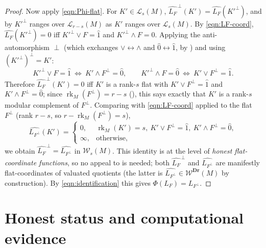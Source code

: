 \documentclass{article}
\theoremstyle{definition}
\newcommand{\rk}{\operatorname{rk}}
\newcommand{\Dr}{\mathbf{Dr}}
\newcommand{\cLL}{\mathcal{L}}
\newcommand{\cW}{\mathcal{W}}
\begin{document}
\begin{proof}
Now apply \eqref{eqn:Phi-flat}. For $K'\in\cLL_{s}(M)$,
$\widehat{L_F}^{\,\perp}(K')=\widehat{L_F}(K'^{\perp})$, and by  $K'^{\perp}$ ranges
over $\cLL_{r-s}(M)$ as $K'$ ranges over $\cLL_{s}(M)$. By \eqref{eqn:LF-coord},
$\widehat{L_F}(K'^{\perp})=0$ iff $K'^{\perp}\vee F=\hat1$ and $K'^{\perp}\wedge F=\hat0$. Applying
the anti-automorphism $\perp$ (which exchanges $\vee\leftrightarrow\wedge$ and
$\hat0\leftrightarrow\hat1$, by ) and using $(K'^{\perp})^{\perp}=K'$:
\[
  K'^{\perp}\vee F=\hat1\ \Longleftrightarrow\ K'\wedge F^{\perp}=\hat0,\qquad
  K'^{\perp}\wedge F=\hat0\ \Longleftrightarrow\ K'\vee F^{\perp}=\hat1 .
\]
Therefore $\widehat{L_F}^{\,\perp}(K')=0$ iff $K'$ is a rank-$s$ flat with $K'\vee F^{\perp}=\hat1$
and $K'\wedge F^{\perp}=\hat0$; since $\rk_M(F^{\perp})=r-s$ (), this says exactly that
$K'$ is a rank-$s$ modular complement of $F^{\perp}$. Comparing with \eqref{eqn:LF-coord} applied to
the flat $F^{\perp}$ (rank $r-s$, so $r-\rk_M(F^{\perp})=s$),
\[
  \widehat{L_{F^{\perp}}}(K')=\begin{cases}0,&\rk_M(K')=s,\ K'\vee F^{\perp}=\hat1,\ K'\wedge
  F^{\perp}=\hat0,\\ \infty,&\text{otherwise,}\end{cases}
\]
we obtain $\widehat{L_F}^{\,\perp}=\widehat{L_{F^{\perp}}}$ in $\cW_{s}(M)$. This identity is at the
level of \emph{honest flat-coordinate functions}, so no appeal to  is
needed; both $\widehat{L_F}^{\,\perp}$ and $\widehat{L_{F^{\perp}}}$ are manifestly flat-coordinates
of valuated quotients (the latter is $\widehat{L_{F^{\perp}}}\in\cW^{\Dr}(M)$ by construction). By
\eqref{eqn:identification} this gives $\Phi(L_F)=L_{F^{\perp}}$.
\end{proof}

\section{Honest status and computational evidence}
\end{document}
